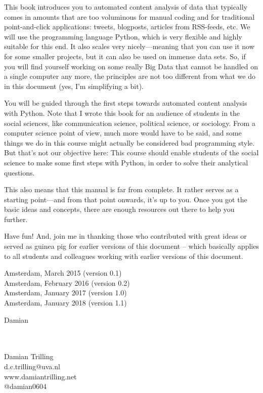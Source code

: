 \documentclass[a4paper,12pt]{book}
\begin{document}
This book introduces you to automated content analysis of data that typically comes in amounts that are too voluminous for manual coding and for traditional point-and-click applications: tweets, blogposts, articles from RSS-feeds, etc. We will use the programming language Python, which is very flexible and highly suitable for this end. It also scales very nicely---meaning that you can use it now for some smaller projects, but it can also be used on immense data sets. So, if you will find yourself working on some really Big Data that cannot be handled on a single computer any more, the principles are not too different from what we do in this document (yes, I'm simplifying a bit).

You will be guided through the first steps towards automated content analysis with Python. Note that I wrote this book for an audience of students in the social sciences, like communication science, political science, or sociology. From a computer science point of view, much more would have to be said, and some things we do in this course might actually be considered bad programming style. But that's not our objective here: This course should enable students of the social science to make some first steps with Python, in order to solve their analytical questions.

This also means that this manual is far from complete. It rather serves as a starting point---and from that point onwards, it's up to you. Once you got the basic ideas and concepts, there are enough resources out there to help you further.

Have fun! And, join me in thanking those who contributed with great ideas or served as guinea pig for earlier versions of this document -- which basically applies to all students and colleagues working with earlier versions of this document. 

\vspace{.5cm}

\begin{flushright}
Amsterdam, March 2015 (version 0.1)\\
Amsterdam, February 2016 (version 0.2)\\
Amsterdam, January 2017 (version 1.0)\\
Amsterdam, January 2018 (version 1.1)
\end{flushright}

Damian



\begin{flushright}
~\\~\\Damian Trilling\\
d.c.trilling@uva.nl\\
www.damiantrilling.net\\
@damian0604

\end{flushright}
\end{document}
